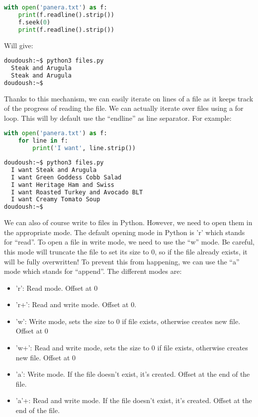 \begin{lstlisting}[language=python]
with open('panera.txt') as f:
    print(f.readline().strip())
    f.seek(0)
    print(f.readline().strip())
\end{lstlisting}

Will give:

\begin{lstlisting}[language=bash]
doudoush:~$ python3 files.py
  Steak and Arugula
  Steak and Arugula
doudoush:~$
\end{lstlisting}

Thanks to this mechanism, we can easily iterate
on lines of a file as it keeps track of the progress of reading the file. We can
actually iterate over files using a for loop. This will by default use the ``endline''
as line separator. For example:

\begin{lstlisting}[language=python]
with open('panera.txt') as f:
    for line in f:
        print('I want', line.strip())
\end{lstlisting}

\begin{lstlisting}[language=bash]
doudoush:~$ python3 files.py
  I want Steak and Arugula
  I want Green Goddess Cobb Salad
  I want Heritage Ham and Swiss
  I want Roasted Turkey and Avocado BLT
  I want Creamy Tomato Soup
doudoush:~$
\end{lstlisting}

We can also of course write to files in Python. However, we need
to open them in the appropriate mode. The default opening mode
in Python is 'r' which stands for ``read''. To open a file in write
mode, we need to use the ``w'' mode. Be careful, this mode will truncate
the file to set its size to 0, so if the file already exists, it will be fully overwritten!
To prevent this from happening, we can use the ``a'' mode which stands for ``append''.
The different modes are:

\begin{itemize}
\item 'r': Read mode. Offset at 0
\item 'r+': Read and write mode. Offset at 0.
\item 'w': Write mode, sets the size to 0 if file exists, otherwise creates new file. Offset at 0
\item 'w+': Read and write mode, sets the size to 0 if file exists, otherwise creates new file. Offset at 0
\item 'a': Write mode. If the file doesn't exist, it's created. Offset at the end of the file.
\item 'a'+: Read and write mode. If the file doesn't exist, it's created. Offset at the end of the file.
\end{itemize}

